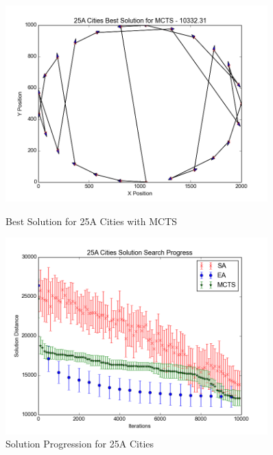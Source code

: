 \begin{figure}[H]
\begin{minipage}{0.45\textwidth}
        \centering
        \includegraphics[width=0.9\textwidth]{25ACity_MCTS.png} %
        \caption{Best Solution for 25A Cities with MCTS}
        \label{fig:25Acity_MCTS}
    \end{minipage}\hfill
    \begin{minipage}{0.45\textwidth}
		\centering
		\includegraphics[width=0.9\textwidth]{25ACity_Solutions.png}
		\caption{Solution Progression for 25A Cities}
		\label{fig:25Acity_Solution}
    \end{minipage}\hfill
\end{figure}